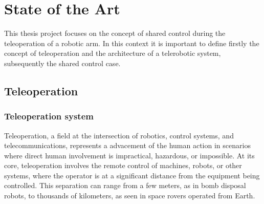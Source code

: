 



\chapter{State of the Art} %

\label{Chapter2} %

This thesis project focuses on the concept of shared control during the teleoperation of a robotic arm.
In this context it is important to define firstly the concept of teleoperation and the architecture of a telerobotic system, subsequently the shared control case.
\section{Teleoperation}
\subsection{Teleoperation system }
Teleoperation, a field at the intersection of robotics, control systems, and telecommunications, represents a advacement of the human action in scenarios where direct human involvement is impractical, hazardous, or impossible. 
At its core, teleoperation involves the remote control of machines, robots, or other systems, where the operator is at a significant distance from the equipment being controlled. This separation can range from a few meters, as in bomb disposal robots, to thousands of kilometers, as seen in space rovers operated from Earth.


